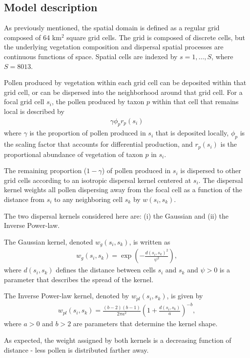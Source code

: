 \documentclass[12pt]{article}
\begin{document}
\subsection{Model description}

As previously mentioned, the spatial domain is defined as a regular
grid composed of 64 km$^2$ square grid cells. The grid is composed of
discrete cells, but the underlying vegetation composition and
dispersal spatial processes are continuous functions of space. Spatial
cells are indexed by $s=1,\ldots,S$, where $S=8013$.

Pollen produced by vegetation within each grid cell can be deposited
within that grid cell, or can be dispersed into the neighborhood
around that grid cell. For a focal grid cell $s_i$, the pollen
produced by taxon $p$ within that cell that remains local is described
by
\begin{align}
\gamma \phi_p r_p(s_i)
\end{align} 
where $\gamma$ is the proportion of pollen produced in $s_i$ that is
deposited locally, $\phi_p$ is the scaling factor that accounts for
differential production, and $r_p(s_i)$ is the proportional abundance
of vegetation of taxon $p$ in $s_i$.

The remaining proportion ($1-\gamma$) of pollen produced in $s_i$ is
dispersed to other grid cells according to an isotropic dispersal
kernel centered at $s_i$. The dispersal kernel weights all pollen
dispersing away from the focal cell as a function of the distance from
$s_i$ to any neighboring cell $s_k$ by $w(s_i, s_k)$. 

The two dispersal kernels considered here are: (i) the Gaussian and
(ii) the Inverse Power-law.

The Gaussian kernel, denoted $w_g(s_i,s_k)$, is written as
\begin{align}
w_g(s_i, s_k) = \exp\left( - \frac{d(s_i, s_k)^2}{\psi^2} \right),
\end{align}
where $d(s_i,s_k)$ defines the distance between cells $s_i$ and $s_k$
and $\psi>0$ is a parameter that describes the spread of the kernel. 

The Inverse Power-law kernel, denoted by $w_{pl}(s_i,s_k)$, is given by
\begin{align}
w_{pl}(s_i, s_k) = \frac{(b-2)(b-1)}{2 \pi a^2} \left( 1 + \frac{d(s_i, s_k)}{a} \right)^{-b},
\end{align}
where $a>0$ and $b>2$ are parameters that determine the kernel shape. 

As expected, the weight assigned by both kernels is a decreasing function
of distance - less pollen is distributed farther away.
\end{document}
